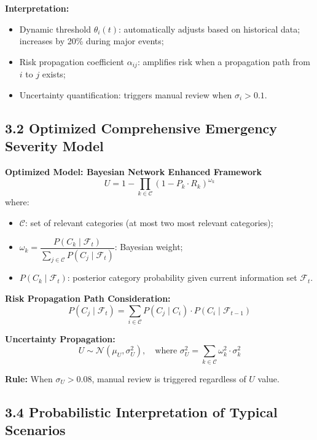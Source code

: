\documentclass{article}
\numberwithin{equation}{section}
\begin{document}
\textbf{Interpretation:}
\begin{itemize}
    \item Dynamic threshold $ \theta_i(t) $: automatically adjusts based on historical data; increases by 20\% during major events;
    \item Risk propagation coefficient $ \alpha_{ij} $: amplifies risk when a propagation path from $ i $ to $ j $ exists;
    \item Uncertainty quantification: triggers manual review when $ \sigma_i > 0.1 $.
\end{itemize}

\subsection*{3.2 Optimized Comprehensive Emergency Severity Model}

\textbf{Optimized Model: Bayesian Network Enhanced Framework}
$$
U = 1 - \prod_{k \in \mathcal{C}} (1 - P_k \cdot R_k)^{\omega_k}
$$
where:
\begin{itemize}
    \item $ \mathcal{C} $: set of relevant categories (at most two most relevant categories);
    \item $ \omega_k = \dfrac{P(C_k \mid \mathcal{F}_t)}{\sum_{j \in \mathcal{C}} P(C_j \mid \mathcal{F}_t)} $: Bayesian weight;
    \item $ P(C_k \mid \mathcal{F}_t) $: posterior category probability given current information set $ \mathcal{F}_t $.
\end{itemize}

\textbf{Risk Propagation Path Consideration:}
$$
P(C_j \mid \mathcal{F}_t) = \sum_{i \in \mathcal{C}} P(C_j \mid C_i) \cdot P(C_i \mid \mathcal{F}_{t-1})
$$

\textbf{Uncertainty Propagation:}
$$
U \sim \mathcal{N}\left(\mu_U, \sigma_U^2\right), \quad \text{where } \sigma_U^2 = \sum_{k \in \mathcal{C}} \omega_k^2 \cdot \sigma_k^2
$$

\noindent\textbf{Rule:} When $ \sigma_U > 0.08 $, manual review is triggered regardless of $ U $ value.

\subsection*{3.4 Probabilistic Interpretation of Typical Scenarios}
\end{document}
